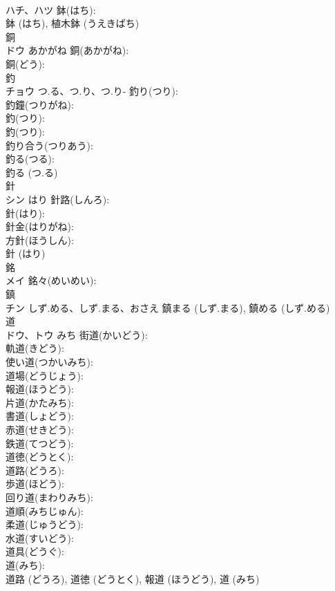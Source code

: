 \documentclass[8pt]{extreport}
\begin{document}
\begin{CJK}{UTF8}{min}
\\	ハチ、ハツ		鉢(はち): 
\\	鉢 (はち), 植木鉢 (うえきばち)
\\	銅			
\\	ドウ	あかがね	銅(あかがね): 
\\	銅(どう): 
\\	釣			
\\	チョウ	つ.る、つ.り、つ.り-	釣り(つり): 
\\	釣鐘(つりがね): 
\\	釣(つり): 
\\	釣(つり): 
\\	釣り合う(つりあう): 
\\	釣る(つる): 
\\	釣る (つ.る)
\\	針			
\\	シン	はり	針路(しんろ): 
\\	針(はり): 
\\	針金(はりがね): 
\\	方針(ほうしん): 
\\	針 (はり)
\\	銘			
\\	メイ		銘々(めいめい): 
\\	鎮			
\\	チン	しず.める、しず.まる、おさえ		鎮まる (しず.まる), 鎮める (しず.める)
\\	道			
\\	ドウ、トウ	みち	街道(かいどう): 
\\	軌道(きどう): 
\\	使い道(つかいみち): 
\\	道場(どうじょう): 
\\	報道(ほうどう): 
\\	片道(かたみち): 
\\	書道(しょどう): 
\\	赤道(せきどう): 
\\	鉄道(てつどう): 
\\	道徳(どうとく): 
\\	道路(どうろ): 
\\	歩道(ほどう): 
\\	回り道(まわりみち): 
\\	道順(みちじゅん): 
\\	柔道(じゅうどう): 
\\	水道(すいどう): 
\\	道具(どうぐ): 
\\	道(みち): 
\\	道路 (どうろ), 道徳 (どうとく), 報道 (ほうどう), 道 (みち)

\end{CJK}
\end{document}
